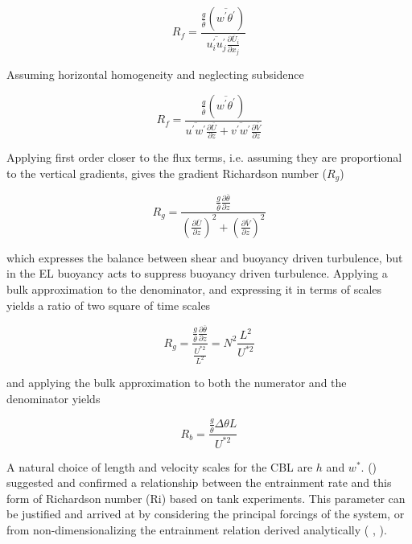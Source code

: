 \begin{equation}
R_{f} = \frac{\frac{g}{\overline{\theta}} \left( \overline{w^{'}\theta^{'}} \right)}{\overline{u_{i}^{'}u_{j}^{'}}\frac{\partial \overline{U}_{i}}{\partial x_{j}}}
\end{equation}
 
Assuming horizontal homogeneity and neglecting subsidence
  
\begin{equation}
R_{f} = \frac{\frac{g}{\overline{\theta}} \left( \overline{w^{'}\theta^{'}} \right)}{\overline{u^{'}w^{'}}\frac{\partial \overline{U}}{\partial z} + \overline{v^{'}w^{'}}\frac{\partial \overline{V}}{\partial z}}
\end{equation}

Applying first order closer to the flux terms, i.e. assuming they are proportional to the vertical gradients, gives the gradient Richardson number ($R_{g}$)

\begin{equation}
R_{g} = \frac{ \frac{g}{\overline{\theta}} \frac{\partial \overline{\theta}}{\partial z}}{\left( \frac{ \partial \overline{U}}{\partial z} \right)^{2} + \left( \frac{\partial \overline{V}}{\partial z} \right)^{2}} 
\end{equation}

which expresses the balance between shear and buoyancy driven turbulence, but in the \acs{EL} buoyancy acts to suppress buoyancy driven turbulence.  
Applying a bulk approximation to the denominator, and expressing it in terms of scales yields a ratio of two square of time scales

\begin{equation}
R_{g} = \frac{\frac{g}{\overline{\theta}} \frac{\partial \overline{\theta}}{\partial z}}{\frac{U^{*2}}{L^{2}}} = N^{2}\frac{L^{2}}{U^{*2}}
\end{equation}


and applying the bulk approximation to both the numerator and the denominator yields

\begin{equation}
R_{b} = \frac{\frac{g}{\overline{\theta}} \Delta \theta L}{U^{*2}}
\end{equation}

A natural choice of length and velocity scales for the \acs{CBL} are $h$ and $w^{*}$.  \citeauthor{EllTurn} (\cite{EllTurn}) suggested and confirmed a relationship between the entrainment rate and this form of 
Richardson number (\acs{Ri}) based on tank experiments.  This parameter can be justified and arrived at by considering the principal forcings of the system, or from non-dimensionalizing the entrainment relation  derived
analytically (\citeauthor{Tennekes73}  \cite{Tennekes73}, \citeauthor{Deardorff72} \cite{Deardorff72}).

